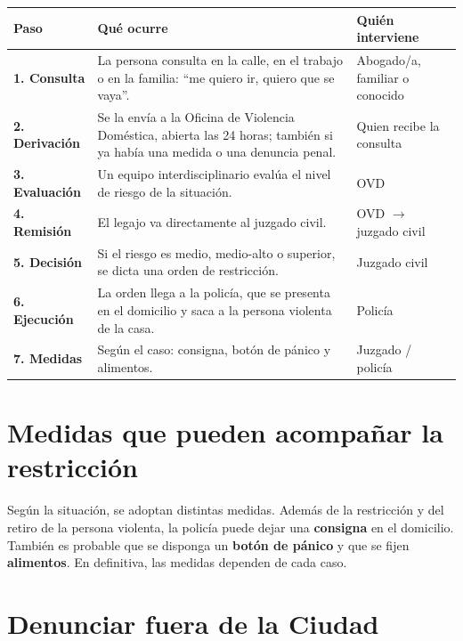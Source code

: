 \documentclass[12pt,oneside]{book}
\begin{document}
\begin{table}[H]
\centering
\small
\begin{tabularx}{\textwidth}{
    >{\raggedright\arraybackslash}p{2.6cm}
    >{\raggedright\arraybackslash}X
    >{\raggedright\arraybackslash}p{3.3cm}
}
\toprule
\textbf{Paso} & \textbf{Qué ocurre} & \textbf{Quién interviene} \\
\midrule
\textbf{1. Consulta} & La persona consulta en la calle, en el trabajo o en la familia: ``me quiero ir, quiero que se vaya''. & Abogado/a, familiar o conocido \\
\textbf{2. Derivación} & Se la envía a la Oficina de Violencia Doméstica, abierta las 24 horas; también si ya había una medida o una denuncia penal. & Quien recibe la consulta \\
\textbf{3. Evaluación} & Un equipo interdisciplinario evalúa el nivel de riesgo de la situación. & OVD \\
\textbf{4. Remisión} & El legajo va directamente al juzgado civil. & OVD $\rightarrow$ juzgado civil \\
\textbf{5. Decisión} & Si el riesgo es medio, medio-alto o superior, se dicta una orden de restricción. & Juzgado civil \\
\textbf{6. Ejecución} & La orden llega a la policía, que se presenta en el domicilio y saca a la persona violenta de la casa. & Policía \\
\textbf{7. Medidas} & Según el caso: consigna, botón de pánico y alimentos. & Juzgado / policía \\
\bottomrule
\end{tabularx}
\end{table}

\section{Medidas que pueden acompañar la restricción}

Según la situación, se adoptan distintas medidas. Además de la restricción y del retiro de la persona violenta, la policía puede dejar una \textbf{consigna} en el domicilio. También es probable que se disponga un \textbf{botón de pánico} y que se fijen \textbf{alimentos}. %
En definitiva, las medidas dependen de cada caso.

\section{Denunciar fuera de la Ciudad}
\end{document}
